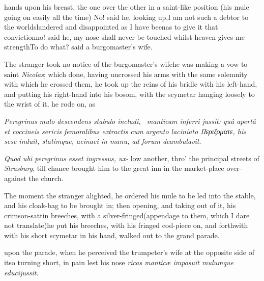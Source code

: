 \documentclass{article}
\begin{document}
\baselineskip
{}

\newpage
\noindent
hands upon his breast, the one over the other in a
saint-like position (his mule going on easily all the time)
No!  said he, looking up,\tsk I am not such a debtor to the
world\tsk slandered and disappointed as I have been\tsh as
to give it that conviction\tsk no! said he, my nose shall
never be touched whilst heaven gives me strength\tsk To do
what? said a burgomaster’s wife.

The stranger took no notice of the burgomaster’s wife\tsh he was making a vow to
saint \textit{Nicolas}; which done, having uncrossed his arms with the same
solemnity with which he crossed them, he took up the reins of his bridle with his
left-hand, and putting his right-hand into his bosom, with the scymetar hanging
loosely to the wrist of it, he rode on, as\break
{}

\null{}\baselineskip
\textit{Peregrinus mulo descendens stabulo includi, \et\ manticam inferri jussit: quâ
aper\-tâ et coccineis sericis femoralibus extractis cum argento laciniato
{\small Περι\-ζο\-ματε}, his sese induit, statimque, acinaci in manu, ad forum deambulavit}.

\null{}\baselineskip
\textit{Quod ubi peregrinus esset ingressus, ux-\break
{}
}
low another, thro’ the principal streets of \textit{Strasburg}, till chance
brought him to the great inn in the market-place over-against the church.

The moment the stranger alighted, he ordered his mule to be
led into the stable, and his cloak-bag to be brought in;
then opening, and taking out of it, his crimson-sattin
breeches, with a silver-fringed\tsk (appendage to them,
which I dare not translate)\tsk he put his breeches, with
his fringed cod-piece on, and forth\-with with his short
scymetar in his hand, walked out to the grand parade.

 upon the parade, when he perceived the
trumpeter’s wife at the opposite side of it\tsk so turning short, in pain lest his
nose 
\textit{ricas manticæ imposuit mulumque educi\break jussit.}
\end{document}
